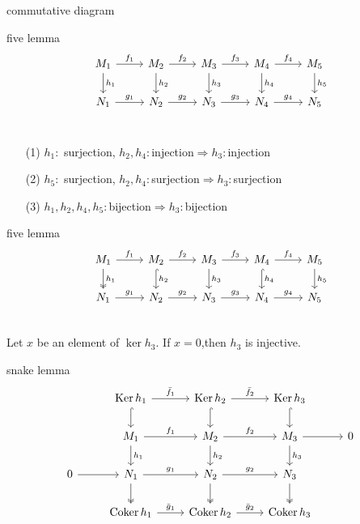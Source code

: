 \documentclass[unicode]{beamer}
\DeclareMathOperator{\Ker}{Ker}
\DeclareMathOperator{\coker}{Coker}
\begin{document}
	\begin{frame}[fragile]{commutative diagram}%
		\begin{block}{five lemma}
			\[ 
				\begin{tikzcd}
					M_1 \arrow[r,"f_1"]\arrow[d,"h_1"] & M_2 \arrow[r,"f_2"]\arrow[d,"h_2"] & M_3 \arrow[r,"f_3"]\arrow[d,"h_3"] & M_4\arrow[r,"f_4"]\arrow[d,"h_4"] & M_5 \arrow[d,"h_5"]\\
					N_1 \arrow[r,"g_1"] & N_2 \arrow[r,"g_2"] & N_3 \arrow[r,"g_3"] & N_4\arrow[r,"g_4"] & N_5 \\
				\end{tikzcd}
		\]
		\vspace{-35pt}
		\begin{enumerate}
			\item[(1)]
				$h_1\colon$ surjection, $h_2,h_4\colon$injection$\Longrightarrow h_3\colon $injection
			\item[(2)]
				$h_5\colon$ surjection, $h_2,h_4\colon$surjection$\Longrightarrow h_3\colon $surjection
			\item[(3)]
				 $h_1,h_2,h_4,h_5\colon$bijection$\Longrightarrow h_3\colon $bijection
		\end{enumerate}
		\end{block}
	\end{frame}
	\begin{frame}[fragile]{five lemma}
			\[ 
				\begin{tikzcd}
					M_1 \arrow[r,"f_1"]\arrow[d,two heads,"h_1"] & M_2 \arrow[r,"f_2"]\arrow[d,hook,"h_2"] & M_3 \arrow[r,"f_3"]\arrow[d,"h_3"] & M_4\arrow[r,"f_4"]\arrow[d,hook,"h_4"] & M_5 \arrow[d,"h_5"]\\
					N_1 \arrow[r,"g_1"] & N_2 \arrow[r,"g_2"] & N_3 \arrow[r,"g_3"] & N_4\arrow[r,"g_4"] & N_5 \\
				\end{tikzcd}
		\]
		Let $x$ be an element of $\ker h_3$. If $x=0$,then $h_3$ is injective.
	\end{frame}
	\begin{frame}[fragile]{}
		\begin{block}{snake lemma}
			\[ 
				\begin{tikzcd}
					&\Ker h_1 \arrow[r,"\bar f_1"]\arrow[d,hook] & \Ker h_2 \arrow[r,"\bar f_2"] \arrow[d,hook]& \Ker h_3\arrow[d,hook]\\
					 & M_1 \arrow[r,"f_1"]\arrow[d,"h_1"] & M_2 \arrow[r,"f_2"]\arrow[d,"h_2"] & M_3\arrow[r]\arrow[d,"h_3"] &  0\\
					0 \arrow[r] & N_1 \arrow[r,"g_1"]\arrow[d,two heads] & N_2 \arrow[r,"g_2"]\arrow[d,two heads]& N_3\arrow[d,two heads] &  \\
						&\coker h_1 \arrow[r,"\bar g_1"] & \coker h_2 \arrow[r,"\bar g_2"] & \coker h_3
				\end{tikzcd}
		\]
		\end{block}
	\end{frame}
\end{document}
